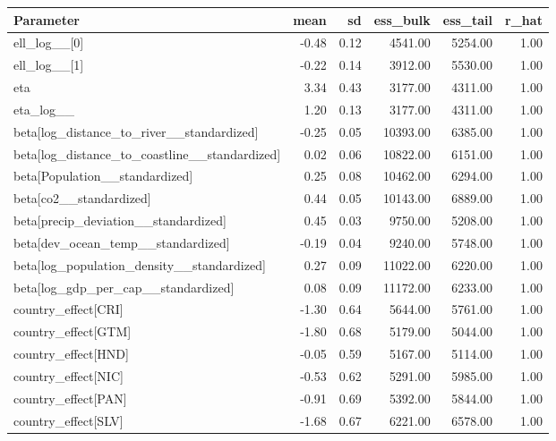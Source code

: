 \begin{table}[H]
\centering
{}
\label{tab:full_model_params_ca}
\footnotesize
\begin{tabular}{lrrrrr}
\toprule
\textbf{Parameter} & \textbf{mean} & \textbf{sd} & \textbf{ess\_bulk} & \textbf{ess\_tail} & \textbf{r\_hat} \\
\midrule
ell\_log\_\_[0] & -0.48 & 0.12 & 4541.00 & 5254.00 & 1.00 \\
ell\_log\_\_[1] & -0.22 & 0.14 & 3912.00 & 5530.00 & 1.00 \\
eta & 3.34 & 0.43 & 3177.00 & 4311.00 & 1.00 \\
eta\_log\_\_ & 1.20 & 0.13 & 3177.00 & 4311.00 & 1.00 \\
beta[log\_distance\_to\_river\_\_standardized] & -0.25 & 0.05 & 10393.00 & 6385.00 & 1.00 \\
beta[log\_distance\_to\_coastline\_\_standardized] & 0.02 & 0.06 & 10822.00 & 6151.00 & 1.00 \\
beta[Population\_\_standardized] & 0.25 & 0.08 & 10462.00 & 6294.00 & 1.00 \\
beta[co2\_\_standardized] & 0.44 & 0.05 & 10143.00 & 6889.00 & 1.00 \\
beta[precip\_deviation\_\_standardized] & 0.45 & 0.03 & 9750.00 & 5208.00 & 1.00 \\
beta[dev\_ocean\_temp\_\_standardized] & -0.19 & 0.04 & 9240.00 & 5748.00 & 1.00 \\
beta[log\_population\_density\_\_standardized] & 0.27 & 0.09 & 11022.00 & 6220.00 & 1.00 \\
beta[log\_gdp\_per\_cap\_\_standardized] & 0.08 & 0.09 & 11172.00 & 6233.00 & 1.00 \\
country\_effect[CRI] & -1.30 & 0.64 & 5644.00 & 5761.00 & 1.00 \\
country\_effect[GTM] & -1.80 & 0.68 & 5179.00 & 5044.00 & 1.00 \\
country\_effect[HND] & -0.05 & 0.59 & 5167.00 & 5114.00 & 1.00 \\
country\_effect[NIC] & -0.53 & 0.62 & 5291.00 & 5985.00 & 1.00 \\
country\_effect[PAN] & -0.91 & 0.69 & 5392.00 & 5844.00 & 1.00 \\
country\_effect[SLV] & -1.68 & 0.67 & 6221.00 & 6578.00 & 1.00 \\
\bottomrule
\end{tabular}
\end{table}
